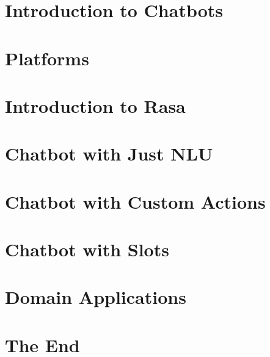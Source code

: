 \section[Intro]{Introduction to Chatbots}


\section[Platforms]{Platforms}



\section[Rasa]{Introduction to Rasa}





\section[NLU]{Chatbot with Just NLU}



\section[Custom]{Chatbot with Custom Actions}


\section[Slots]{Chatbot with Slots}


\section[Appl]{Domain Applications}


\section[End]{The End}

